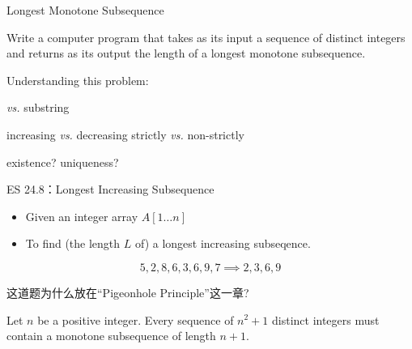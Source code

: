\begin{frame}{}
  \centerline{\LARGE Longest Monotone Subsequence}
\end{frame}

\begin{frame}{}
  \begin{example}
    Write a computer program that takes as its input a sequence of distinct integers
    and returns as its output the length of a longest monotone subsequence.
  \end{example}

  \vspace{0.50cm}
  \pause
  Understanding this problem:

  \vspace{0.20cm}
  \begin{description}[Subsequence]
    \pause
    \item[Subsequence] \emph{vs.} substring
    \pause
  \item[Monotone] increasing \emph{vs.} decreasing \pause \qquad strictly \emph{vs.} non-strictly
    \pause
    \item[Longest] existence? uniqueness?
  \end{description}
\end{frame}

\begin{frame}{}
  \begin{exampleblock}{ES 24.8：Longest Increasing Subsequence}
    \begin{itemize}
      \item Given an integer array $A[1 \ldots n]$
      \item To find (the length $L$ of) a longest increasing subseqence.
    \end{itemize}
  \end{exampleblock}

  \vspace{0.30cm}
  \[
    5,2,8,6,3,6,9,7 \implies 2, 3, 6, 9
  \]
\end{frame}

\begin{frame}{}
  \begin{center}
     这道题为什么放在``Pigeonhole Principle''这一章?
  \end{center}

  \pause

  \pause
  \begin{theorem}
     Let $n$ be a positive integer. 
     Every sequence of $n^2 + 1$ distinct integers must contain a monotone subsequence of length $n + 1$.
  \end{theorem}
\end{frame}

